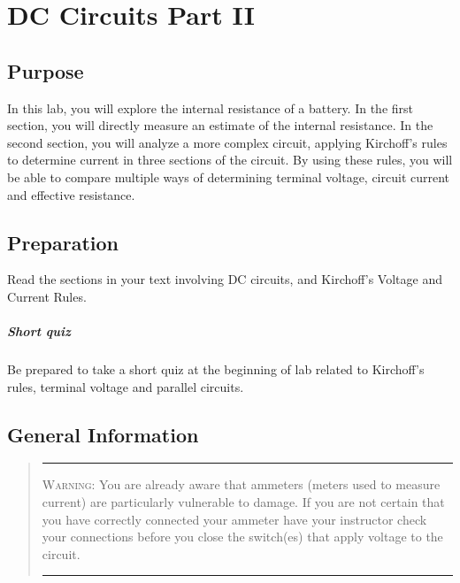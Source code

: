 
\chapter {DC Circuits Part II}

\section {Purpose}  
In this lab, you will explore the internal resistance of a battery.  In the first section, you will directly measure an estimate of the internal resistance.  In the second section, you will analyze a more complex circuit, applying Kirchoff's rules to determine current in three sections of the circuit.  By using these rules, you will be able to compare multiple ways of determining terminal voltage, circuit current and effective resistance.

\section{Preparation} Read the sections in your text involving DC circuits, and Kirchoff's Voltage and Current Rules.

\paragraph {Short quiz}  Be prepared to take a short quiz at the beginning of lab related to Kirchoff's rules, terminal voltage and parallel circuits.

\section {General Information}
\begin{quote}\hrule
\textsc{Warning:}  You are already aware that ammeters (meters used to measure current) are particularly vulnerable to damage.  If you are not certain that you have correctly connected your ammeter have your instructor check your connections before you close the switch(es) that apply voltage to the circuit.
\hrule
\end{quote}

